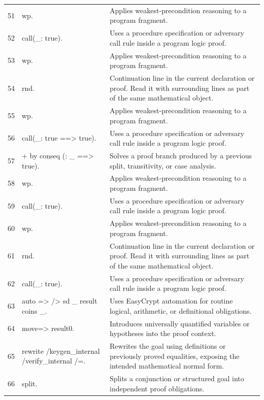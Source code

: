 \documentclass[10pt]{article}
\begin{document}
\begin{longtable}{r L{0.53\textwidth} L{0.37\textwidth}}
51 & {\ttfamily\scriptsize wp.} & Applies weakest-precondition reasoning to a program fragment. \\
52 & {\ttfamily\scriptsize call(\_: true).} & Uses a procedure specification or adversary call rule inside a program logic proof. \\
53 & {\ttfamily\scriptsize wp.} & Applies weakest-precondition reasoning to a program fragment. \\
54 & {\ttfamily\scriptsize rnd.} & Continuation line in the current declaration or proof.  Read it with surrounding lines as part of the same mathematical object. \\
55 & {\ttfamily\scriptsize wp.} & Applies weakest-precondition reasoning to a program fragment. \\
56 & {\ttfamily\scriptsize call(\_: true ==> true).} & Uses a procedure specification or adversary call rule inside a program logic proof. \\
57 & {\ttfamily\scriptsize + by conseq (: \_ ==> true).} & Solves a proof branch produced by a previous split, transitivity, or case analysis. \\
58 & {\ttfamily\scriptsize wp.} & Applies weakest-precondition reasoning to a program fragment. \\
59 & {\ttfamily\scriptsize call(\_: true).} & Uses a procedure specification or adversary call rule inside a program logic proof. \\
60 & {\ttfamily\scriptsize wp.} & Applies weakest-precondition reasoning to a program fragment. \\
61 & {\ttfamily\scriptsize rnd.} & Continuation line in the current declaration or proof.  Read it with surrounding lines as part of the same mathematical object. \\
62 & {\ttfamily\scriptsize call(\_: true).} & Uses a procedure specification or adversary call rule inside a program logic proof. \\
63 & {\ttfamily\scriptsize auto => /> sd \_ result coins \_.} & Uses EasyCrypt automation for routine logical, arithmetic, or definitional obligations. \\
64 & {\ttfamily\scriptsize move=> result0.} & Introduces universally quantified variables or hypotheses into the proof context. \\
65 & {\ttfamily\scriptsize rewrite /keygen\_internal /verify\_internal /=.} & Rewrites the goal using definitions or previously proved equalities, exposing the intended mathematical normal form. \\
66 & {\ttfamily\scriptsize split.} & Splits a conjunction or structured goal into independent proof obligations. \\

\end{longtable}
\end{document}
